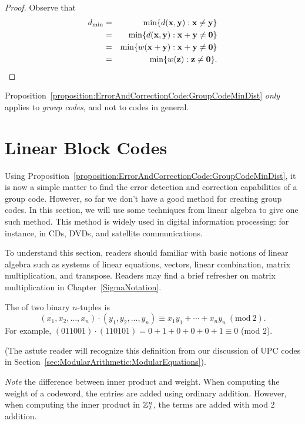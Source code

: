 \begin{proof}
Observe that
\begin{eqnarray*}
d_{\min} &= & \min \{ d({\bold x},{\bold y}) : {\bold x}
\neq
{\bold y} \} \\
&= & \min \{ d({\bold x},{\bold y}) : {\bold x}+{\bold y}
\neq {\bold 0} \} \\
&=& \min\{ w({\bold x} + {\bold y}) : {\bold x}+{\bold y}
\neq {\bold 0} \} \\
& = & \min\{ w({\bold z}) : {\bold z} \neq {\bold 0} \}.
\end{eqnarray*}
\end{proof}
 
 \begin{warn}
 Proposition~\ref{proposition:ErrorAndCorrectionCode:GroupCodeMinDist}  \emph{only} applies to \emph{group codes}, and not to codes in general.
 \end{warn}
 
\section{Linear Block Codes}
\label{sec:ErrorAndCorrectionCode:BlockCodes}
  
Using Proposition~\ref{proposition:ErrorAndCorrectionCode:GroupCodeMinDist}, it is now a simple matter to find the error detection and correction capabilities of a group code. However, so far we don't have a good method  for creating group codes. In this section, we will use some techniques from linear algebra to give one such method. This method is widely used in digital information processing: for instance, in CDs, DVDs, and satellite communications.

To understand this section, readers should familiar with basic notions of linear algebra such as systems of linear equations, vectors, linear combination, matrix multiplication, and transpose. Readers may find a brief refresher on matrix multiplication in Chapter~\ref{SigmaNotation}.
 
 \begin{defn}
The  of two binary
$n$-tuples is
\[
(x_1, x_2, \ldots, x_n) \cdot (y_1, y_2, \ldots, y_n) \equiv x_1 y_1 + \cdots + x_n y_n ~(\mathrm{mod~}2).
\]
For example, $(011001) \cdot (110101) = 0+1+0+0+0+1 \equiv 0$ (mod $2$). 

\noindent
(The astute reader will recognize this definition from our discussion of UPC codes in Section~\ref{sec:ModularArithmetic:ModularEquations}).
\end{defn}
\emph{Note} the difference between inner product and weight. When computing the weight of a codeword, the entries are added using ordinary addition. However, when computing the inner product  in ${\Bbb Z_2^n}$, the terms are added  with mod 2 addition.

